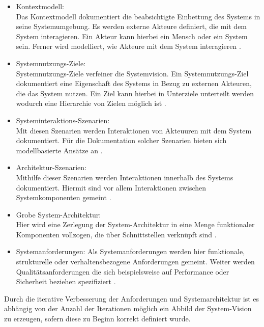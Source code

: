 \begin{itemize}
\item Kontextmodell:\\
Das Kontextmodell dokumentiert die beabsichtigte Einbettung des Systems in seine Systemumgebung. Es werden externe Akteure definiert, die mit dem System interagieren. Ein Akteur kann hierbei ein Mensch oder ein System sein. Ferner wird modelliert, wie Akteure mit dem System interagieren \cite{Poh01}.
\item Systemnutzungs-Ziele:\\
Systemnutzungs-Ziele verfeiner die Systemvision. Ein Systemnutzungs-Ziel dokumentiert eine Eigenschaft des Systems in Bezug zu externen Akteuren, die das System nutzen. Ein Ziel kann hierbei in Unterziele unterteilt werden wodurch eine Hierarchie von Zielen m\"oglich ist \cite{Poh01}.  
\item Systeminteraktions-Szenarien:\\
Mit diesen Szenarien werden Interaktionen von Akteuuren mit dem System dokumentiert. F\"ur die Dokumentation solcher Szenarien bieten sich modellbasierte Ans\"atze an \cite{Poh01}.
\item Architektur-Szenarien:\\
Mithilfe dieser Szenarien werden Interaktionen innerhalb des Systems dokumentiert. Hiermit sind vor allem Interaktionen zwischen Systemkomponenten gemeint \cite{Poh01}. 
\item Grobe System-Architektur:\\
Hier wird eine Zerlegung der System-Architektur in eine Menge funktionaler Komponenten vollzogen, die \"uber Schnittstellen verkn\"upft sind \cite{Poh01}.
\item Systemanforderungen:
Als Systemanforderungen werden hier funktionale, strukturelle oder verhaltensbezogene Anforderungen gemeint. Weiter werden Qualit\"atsanforderungen die sich beispielsweise auf Performance oder Sicherheit beziehen spezifiziert \cite{Poh01}.\\
\end{itemize}

Durch die iterative Verbesserung der Anforderungen und Systemarchitektur ist es abh\"angig von der Anzahl der Iterationen m\"oglich ein Abbild der System-Vision zu erzeugen, sofern diese zu Beginn korrekt definiert wurde.

